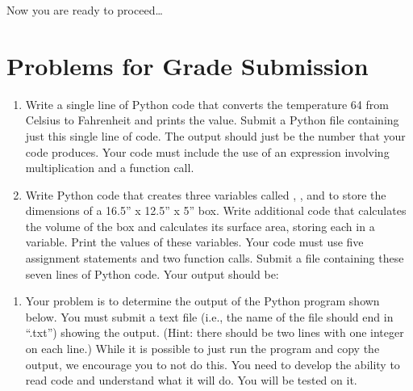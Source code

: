 \documentclass[letterpaper,10pt,english]{sphinxmanual}
\begin{document}
Now you are ready to proceed…


\section{Problems for Grade Submission}
\label{\detokenize{lecture_notes/lec02_calculator_exercises/exercises:problems-for-grade-submission}}\begin{enumerate}
\def\theenumi{\arabic{enumi}}
\def\labelenumi{\theenumi .}
\makeatletter\def\p@enumii{\p@enumi \theenumi .}\makeatother
\item {} 
Write a single line of Python code that converts the temperature
64 from Celsius to Fahrenheit and prints the value.  Submit a Python
file containing just this single line of code.  The output should
just be the number that your code produces.  Your code must include
the use of an expression involving multiplication and a 
function call.

\item {} 
Write Python code that creates three variables called
, , and  to store the dimensions of a 16.5” x
12.5” x 5” box.  Write additional code that calculates the volume
of the box and calculates its surface area, storing each in a
variable.  Print the values of these variables.  Your code must use
five assignment statements and two  function calls.  Submit a
file containing these seven lines of Python code. Your output
should be:

\end{enumerate}

\begin{sphinxVerbatim}[commandchars=\\\{\}]
  
  
\end{sphinxVerbatim}
\begin{enumerate}
\def\theenumi{\arabic{enumi}}
\def\labelenumi{\theenumi .}
\makeatletter\def\p@enumii{\p@enumi \theenumi .}\makeatother
\setcounter{enumi}{2}
\item {} 
Your problem is to determine the output of the Python program shown
below.  You must submit a text file (i.e., the name of the file should end in “.txt”)
showing the output.  (Hint: there should be two lines with one integer on each line.)
While it is possible to just run the program and copy the output, we
 encourage you to not do this.  You need to develop
the ability to read code and understand what it will do.  You will
be tested on it.

\end{enumerate}
\end{document}
